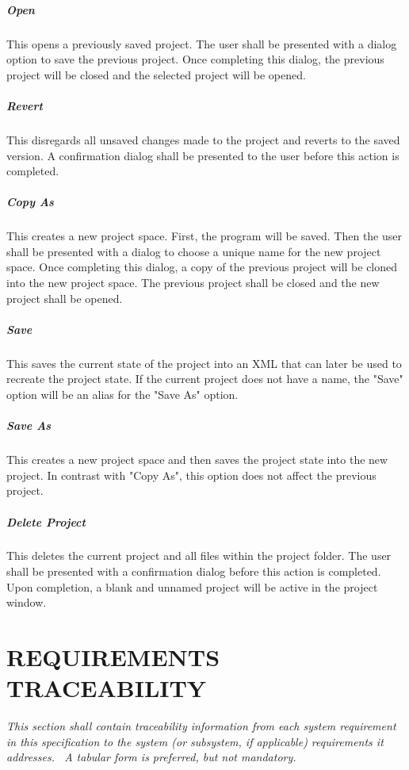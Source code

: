 \documentclass[twoside,letterpaper]{article}
\begin{document}
\subparagraph{Open}
{\color{black}
This opens a previously saved project. The user shall be presented with a dialog option to save the previous project. Once completing this dialog, the previous project will be closed and the selected project will be opened.}

\subparagraph{Revert}
{\color{black}
This disregards all unsaved changes made to the project and reverts to the saved version. A confirmation dialog shall be presented to the user before this action is completed.}

\subparagraph{Copy As}
{\color{black}
This creates a new project space. First, the program will be saved. Then the user shall be presented with a dialog to choose a unique name for the new project space. Once completing this dialog, a copy of the previous project will be cloned into the new project space. The previous project shall be closed and the new project shall be opened.}

\subparagraph{Save}
{\color{black}
This saves the current state of the project into an XML that can later be used to recreate the project state. If the current project does not have a name, the "Save" option will be an alias for the "Save As" option.}

\subparagraph{Save As}
{\color{black}
This creates a new project space and then saves the project state into the new project. In contrast with "Copy As", this option does not affect the previous project. }

\subparagraph{Delete Project}
{\color{black}
This deletes the current project and all files within the project folder. The user shall be presented with a confirmation dialog before this action is completed. Upon completion, a blank and unnamed project will be active in the project window. }









\clearpage\setcounter{page}{1}\pagestyle{Convertvi}
\section[REQUIREMENTS TRACEABILITY]{\rmfamily\bfseries\color{black}
REQUIREMENTS TRACEABILITY}
{\itshape\color{black}
This section shall contain traceability information from each system
requirement in this specification to the system (or subsystem, if
applicable) requirements it addresses. \ A tabular form is preferred,
but not mandatory.}
\end{document}

